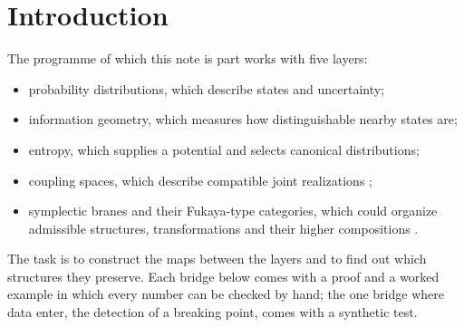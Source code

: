 \documentclass[11pt]{article}
\theoremstyle{definition}
\theoremstyle{remark}
\begin{document}
\begin{abstract}
Every $2\times3$ coupling polytope gives a Fano surface, and for rational margins its disc potential is Morse with one critical point per vertex;
for generic margins the nonzero torus branes lie over couplings where three cells, or the two cells of a column, are smallest and equal; they
never lie over the product coupling when its smallest facet cell is unique; and in all computed cases over the leximin coupling, the coupling lexicographically farthest from breaking, which
usually carries most of them. For every $3\times3$ margin the toric $4$-fold is semi-Fano, and by the Chan--Lau--Leung--Tseng formula its disc
potential has no corrections, so the same computation applies. We give the topology and Maslov indices of the real locus, which for
$2\times3$ and $3\times3$ couplings is non-orientable except in the $\mathbb{CP}^1\times\mathbb{CP}^1$ chambers, and reduce the sheaf model of the
entropy brane to the admissibility of one explicit isotopy. Finally we compute these objects for margins from public data (NHANES and the
General Social Survey): their toric surfaces, nonzero torus branes, entropy brane and its steepness.
\end{abstract}

\tableofcontents

\section{Introduction}\label{sec:intro}

The programme of which this note is part works with five layers:
\begin{itemize}[leftmargin=*,nosep]
\item probability distributions, which describe states and uncertainty;
\item information geometry, which measures how distinguishable nearby states are;
\item entropy, which supplies a potential and selects canonical distributions;
\item coupling spaces, which describe compatible joint realizations \cite{Conditionals,Algebras};
\item symplectic branes and their Fukaya-type categories, which could organize admissible structures, transformations and
  their higher compositions \cite[\S\S7, 10]{Conditionals}.
\end{itemize}
The task is to construct the maps between the layers and to find out which structures they preserve. Each bridge below
comes with a proof and a worked example in which every number can be checked by hand; the one bridge where data enter, the
detection of a breaking point, comes with a synthetic test.
\end{document}
